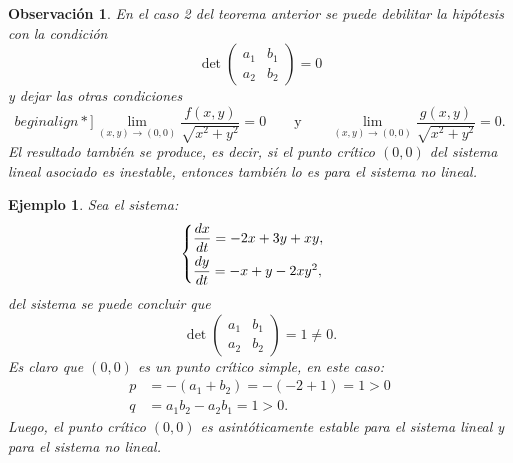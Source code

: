 \documentclass[a5paper,doc,10pt,noapacite]{apa6}
\newcommand{\yds}{\qquad\text{y}\qquad}
\newtheorem{observ}{Observación}
\newtheorem{ejem}{Ejemplo}
\begin{document}
{{\begin{observ}
	En el caso 2 del teorema anterior se puede debilitar la hipótesis con la condición
	\begin{equation}\label{m-19}
		\det\begin{pmatrix} a_1 & b_1 \\ a_2 & b_2\end{pmatrix}=0
	\end{equation}
	y dejar las otras condiciones
	\[begin{align*}]
	\lim_{(x,y)\to(0,0)}\dfrac{f(x,y)}{\sqrt{x^2+y^2}}=0 \yds
	\lim_{(x,y)\to(0,0)}\dfrac{g(x,y)}{\sqrt{x^2+y^2}}=0.
	\]
	El resultado también se produce, es decir, si el punto crítico \((0,0)\) del sistema lineal asociado es inestable, entonces también lo es para el sistema no lineal.
\end{observ}


\begin{ejem}
	Sea el sistema:
	\[
	\begin{cases}
		\dfrac{dx}{dt}=-2x+3y+xy ,	\vspace{0.3em}
		\\
		\dfrac{dy}{dt}=-x+y-2xy^2,
	\end{cases}
	\]
	del sistema se puede concluir que 
	\[
		\det\begin{pmatrix} a_1 & b_1 \\ a_2 & b_2 \end{pmatrix}=1\neq 0.
	\]
	Es claro que  \((0,0)\) es un punto crítico simple, en este caso:
	\begin{align*}
		p&=-(a_1+b_2)=-(-2+1)=1>0\\
		q&=a_1b_2-a_2b_1=1>0.
	\end{align*}
	Luego, el punto crítico \((0,0)\) es asintóticamente estable para el sistema lineal y para el sistema no lineal.
\end{ejem}

}}
\end{document}
